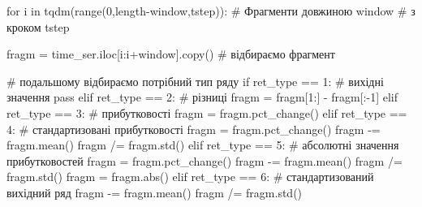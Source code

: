 \documentclass[
  letterpaper,
]{report}
\newenvironment{Shaded}{\begin{snugshade}}{\end{snugshade}}
\newcommand{\BuiltInTok}[1]{\textcolor[rgb]{0.00,0.23,0.31}{#1}}
\newcommand{\CommentTok}[1]{\textcolor[rgb]{0.37,0.37,0.37}{#1}}
\newcommand{\ControlFlowTok}[1]{\textcolor[rgb]{0.00,0.23,0.31}{#1}}
\newcommand{\DecValTok}[1]{\textcolor[rgb]{0.68,0.00,0.00}{#1}}
\newcommand{\KeywordTok}[1]{\textcolor[rgb]{0.00,0.23,0.31}{#1}}
\newcommand{\NormalTok}[1]{\textcolor[rgb]{0.00,0.23,0.31}{#1}}
\newcommand{\OperatorTok}[1]{\textcolor[rgb]{0.37,0.37,0.37}{#1}}
\begin{document}
\begin{Shaded}
\begin{Highlighting}[]
\ControlFlowTok{for}\NormalTok{ i }\KeywordTok{in}\NormalTok{ tqdm(}\BuiltInTok{range}\NormalTok{(}\DecValTok{0}\NormalTok{,length}\OperatorTok{{-}}\NormalTok{window,tstep)):  }\CommentTok{\# Фрагменти довжиною window  }
                                              \CommentTok{\# з кроком tstep}
                                              
\NormalTok{    fragm }\OperatorTok{=}\NormalTok{ time\_ser.iloc[i:i}\OperatorTok{+}\NormalTok{window].copy() }\CommentTok{\# відбираємо фрагмент}

                                          \CommentTok{\# подальшому відбираємо потрібний тип ряду                                         }
    \ControlFlowTok{if}\NormalTok{ ret\_type }\OperatorTok{==} \DecValTok{1}\NormalTok{:                     }\CommentTok{\# вихідні значення }
        \ControlFlowTok{pass}
    \ControlFlowTok{elif}\NormalTok{ ret\_type }\OperatorTok{==} \DecValTok{2}\NormalTok{:                   }\CommentTok{\# різниці}
\NormalTok{        fragm }\OperatorTok{=}\NormalTok{ fragm[}\DecValTok{1}\NormalTok{:] }\OperatorTok{{-}}\NormalTok{ fragm[:}\OperatorTok{{-}}\DecValTok{1}\NormalTok{]}
    \ControlFlowTok{elif}\NormalTok{ ret\_type }\OperatorTok{==} \DecValTok{3}\NormalTok{:                   }\CommentTok{\# прибутковості}
\NormalTok{        fragm }\OperatorTok{=}\NormalTok{ fragm.pct\_change()}
    \ControlFlowTok{elif}\NormalTok{ ret\_type }\OperatorTok{==} \DecValTok{4}\NormalTok{:                   }\CommentTok{\# стандартизовані прибутковості}
\NormalTok{        fragm }\OperatorTok{=}\NormalTok{ fragm.pct\_change()}
\NormalTok{        fragm }\OperatorTok{{-}=}\NormalTok{ fragm.mean()}
\NormalTok{        fragm }\OperatorTok{/=}\NormalTok{ fragm.std()}
    \ControlFlowTok{elif}\NormalTok{ ret\_type }\OperatorTok{==} \DecValTok{5}\NormalTok{:                   }\CommentTok{\# абсолютні значення прибутковостей}
\NormalTok{        fragm }\OperatorTok{=}\NormalTok{ fragm.pct\_change()}
\NormalTok{        fragm }\OperatorTok{{-}=}\NormalTok{ fragm.mean()}
\NormalTok{        fragm }\OperatorTok{/=}\NormalTok{ fragm.std()}
\NormalTok{        fragm }\OperatorTok{=}\NormalTok{ fragm.}\BuiltInTok{abs}\NormalTok{()}
    \ControlFlowTok{elif}\NormalTok{ ret\_type }\OperatorTok{==} \DecValTok{6}\NormalTok{:                   }\CommentTok{\# стандартизований вихідний ряд}
\NormalTok{        fragm }\OperatorTok{{-}=}\NormalTok{ fragm.mean()}
\NormalTok{        fragm }\OperatorTok{/=}\NormalTok{ fragm.std()}
        

\end{Highlighting}
\end{Shaded}
\end{document}
